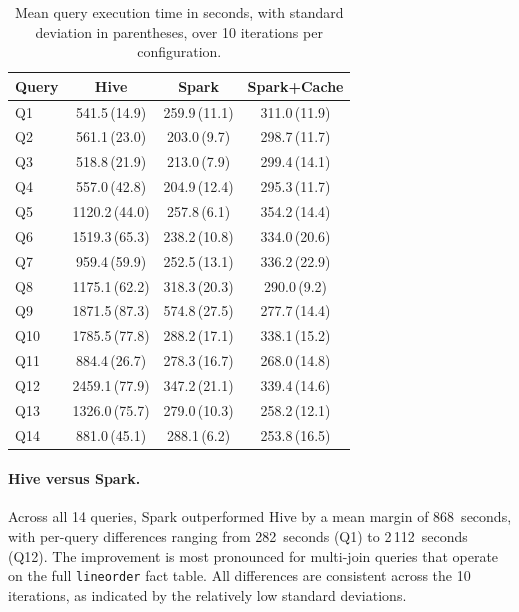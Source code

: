 \begin{table}[htbp]
  \centering
  \caption{Mean query execution time in seconds, with standard deviation in
           parentheses, over 10 iterations per configuration.}
  \label{tab:benchmark-results}
  \renewcommand{\arraystretch}{1.15}
  \small
  \begin{tabular}{@{} l c c c @{}}
    \hline
    \textbf{Query} & \textbf{Hive} & \textbf{Spark} & \textbf{Spark+Cache} \\
    \hline
    Q1  &  541.5\,(14.9) & 259.9\,(11.1) & 311.0\,(11.9) \\
    Q2  &  561.1\,(23.0) & 203.0\,\phantom{0}(9.7) & 298.7\,(11.7) \\
    Q3  &  518.8\,(21.9) & 213.0\,\phantom{0}(7.9) & 299.4\,(14.1) \\
    Q4  &  557.0\,(42.8) & 204.9\,(12.4) & 295.3\,(11.7) \\
    Q5  & 1120.2\,(44.0) & 257.8\,\phantom{0}(6.1) & 354.2\,(14.4) \\
    Q6  & 1519.3\,(65.3) & 238.2\,(10.8) & 334.0\,(20.6) \\
    Q7  &  959.4\,(59.9) & 252.5\,(13.1) & 336.2\,(22.9) \\
    Q8  & 1175.1\,(62.2) & 318.3\,(20.3) & 290.0\,\phantom{0}(9.2) \\
    Q9  & 1871.5\,(87.3) & 574.8\,(27.5) & 277.7\,(14.4) \\
    Q10 & 1785.5\,(77.8) & 288.2\,(17.1) & 338.1\,(15.2) \\
    Q11 &  884.4\,(26.7) & 278.3\,(16.7) & 268.0\,(14.8) \\
    Q12 & 2459.1\,(77.9) & 347.2\,(21.1) & 339.4\,(14.6) \\
    Q13 & 1326.0\,(75.7) & 279.0\,(10.3) & 258.2\,(12.1) \\
    Q14 &  881.0\,(45.1) & 288.1\,\phantom{0}(6.2) & 253.8\,(16.5) \\
    \hline
  \end{tabular}
\end{table}

\paragraph{Hive versus Spark.} Across all 14 queries, Spark outperformed Hive
by a mean margin of 868~seconds, with per-query differences ranging from
282~seconds (Q1) to 2\,112~seconds (Q12). The improvement is most pronounced
for multi-join queries that operate on the full \texttt{lineorder} fact table.
All differences are consistent across the 10 iterations, as indicated by the
relatively low standard deviations.

